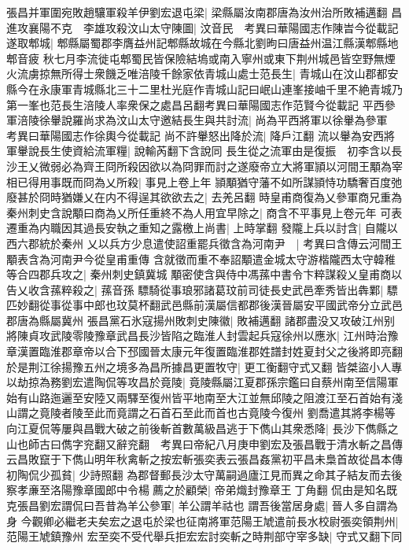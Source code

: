 張昌并軍圍宛敗趙驤軍殺羊伊劉宏退屯梁|{
	梁縣屬汝南郡唐為汝州治所敗補邁翻}
昌進攻襄陽不克　李雄攻殺汶山太守陳圖|{
	汶音民　考異曰華陽國志作陳旹今從載記}
遂取郫城|{
	郫縣屬蜀郡李膺益州記郫縣故城在今縣北劉昫曰唐益州温江縣漢郫縣地郫音疲}
秋七月李流徙屯郫蜀民皆保險結塢或南入寧州或東下荆州城邑皆空野無煙火流虜掠無所得士衆饑乏唯涪陵千餘家依青城山處士范長生|{
	青城山在汶山郡都安縣今在永康軍青城縣北三十二里杜光庭作青城山記曰岷山連峯接岫千里不絶青城乃第一峯也范長生涪陵人率衆保之處昌呂翻考異曰華陽國志作范賢今從載記}
平西參軍涪陵徐轝說羅尚求為汶山太守邀結長生與共討流|{
	尚為平西將軍以徐轝為參軍　考異曰華陽國志作徐輿今從載記}
尚不許轝怒出降於流|{
	降戶江翻}
流以轝為安西將軍轝說長生使資給流軍糧|{
	說輸芮翻下含說同}
長生從之流軍由是復振　初李含以長沙王乂微弱必為齊王冏所殺因欲以為冏罪而討之遂廢帝立大將軍頴以河間王顒為宰相已得用事既而冏為乂所殺|{
	事見上卷上年}
頴顒猶守藩不如所謀頴恃功驕奢百度弛廢甚於冏時猶嫌乂在内不得逞其欲欲去之|{
	去羌呂翻}
時皇甫商復為乂參軍商兄重為秦州刺史含說顒曰商為乂所任重終不為人用宜早除之|{
	商含不平事見上卷元年}
可表遷重為内職因其過長安執之重知之露檄上尚書|{
	上時掌翻}
發隴上兵以討含|{
	自隴以西六郡統於秦州}
乂以兵方少息遣使詔重罷兵徵含為河南尹　|{
	考異曰含傳云河間王顒表含為河南尹今從皇甫重傳}
含就徵而重不奉詔顒遣金城太守游楷隴西太守韓稚等合四郡兵攻之|{
	秦州刺史鎮冀城}
顒密使含與侍中馮蓀中書令卞粹謀殺乂皇甫商以告乂收含蓀粹殺之|{
	蓀音孫}
驃騎從事琅邪諸葛玟前司徒長史武邑牽秀皆出犇鄴|{
	驃匹妙翻從事從事中郎也玟莫杯翻武邑縣前漢屬信都郡後漢晉屬安平國武帝分立武邑郡唐為縣屬冀州}
張昌黨石氷寇揚州敗刺史陳徽|{
	敗補邁翻}
諸郡盡没又攻破江州别將陳貞攻武陵零陵豫章武昌長沙皆陷之臨淮人封雲起兵寇徐州以應氷|{
	江州時治豫章漢置臨淮郡章帝以合下邳國晉太康元年復置臨淮郡姓譜封姓夏封父之後將即亮翻}
於是荆江徐揚豫五州之境多為昌所據昌更置牧守|{
	更工衡翻守式又翻}
皆桀盜小人專以劫掠為務劉宏遣陶侃等攻昌於竟陵|{
	竟陵縣屬江夏郡孫宗鑑曰自蔡州南至信陽軍始有山路迤邐至安陸又兩驛至復州皆平地南至大江並無邱陵之阻渡江至石首始有淺山謂之竟陵者陵至此而竟謂之石首石至此而首也古竟陵今復州}
劉喬遣其將李楊等向江夏侃等屢與昌戰大破之前後斬首數萬級昌逃于下儁山其衆悉降|{
	長沙下儁縣之山也師古曰儁字兖翻又辭兖翻　考異曰帝紀八月庚申劉宏及張昌戰于清水斬之昌傳云昌敗竄于下儁山明年秋禽斬之按宏斬張奕表云張昌姦黨初平昌未梟首故從昌本傳}
初陶侃少孤貧|{
	少詩照翻}
為郡督郵長沙太守萬嗣過廬江見而異之命其子結友而去後察孝亷至洛陽豫章國郎中令楊薦之於顧榮|{
	帝弟熾封豫章王丁角翻}
侃由是知名既克張昌劉宏謂侃曰吾昔為羊公參軍|{
	羊公謂羊祜也}
謂吾後當居身處|{
	晉人多自謂為身}
今觀卿必繼老夫矣宏之退屯於梁也征南將軍范陽王虓遣前長水校尉張奕領荆州|{
	范陽王虓鎮豫州}
宏至奕不受代舉兵拒宏宏討奕斬之時荆部守宰多缺|{
	守式又翻下同}
